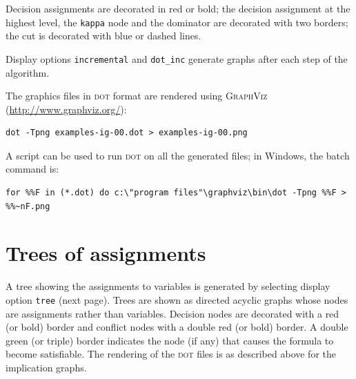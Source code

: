 \documentclass[11pt]{article}
\newcommand*{\p}[1]{\textup{\texttt{#1}}}
\newcommand*{\dt}{\textsc{dot}}
\begin{document}
Decision assignments are decorated in red or bold; the decision
assignment at the highest level, the \p{kappa} node and the dominator
are decorated with two borders; the cut is decorated with blue or
dashed lines.

Display options \p{incremental} and \p{dot\_inc} generate graphs after
each step of the algorithm.

The graphics files in \dt{} format are rendered using
\textsc{GraphViz} (\url{http://www.graphviz.org/}):

\begin{verbatim}
dot -Tpng examples-ig-00.dot > examples-ig-00.png
\end{verbatim}

A script can be used to run \dt{} on all the generated files; in
Windows, the batch command is:

\begin{verbatim}
for %%F in (*.dot) do c:\"program files"\graphviz\bin\dot -Tpng %%F > %%~nF.png
\end{verbatim}


\section{Trees of assignments}

A tree showing the assignments to variables is generated by selecting
display option \p{tree} (next page). Trees are shown as directed acyclic
graphs whose nodes are assignments rather than variables. Decision nodes
are decorated with a red (or bold) border and conflict nodes with a
double red (or bold) border. A double green (or triple) border
indicates the node (if any) that causes the formula to become
satisfiable. The rendering of the \dt{} files is as described above for
the implication graphs.

\newpage

\mbox{}
\vfill
\end{document}
